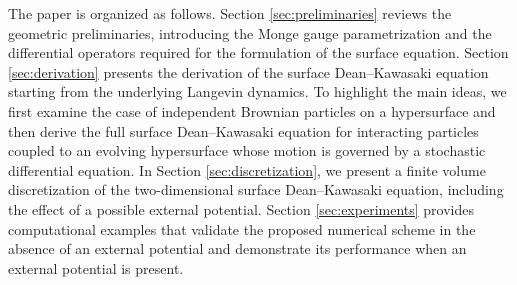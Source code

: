\documentclass[11pt, a4paper]{article}
\begin{document}
The paper is organized as follows. Section \ref{sec:preliminaries} reviews the geometric preliminaries, introducing the Monge gauge parametrization and the differential operators required for the formulation of the surface equation. Section \ref{sec:derivation} presents the derivation of the surface Dean–Kawasaki equation starting from the underlying Langevin dynamics. To highlight the main ideas, we first examine the case of independent Brownian particles on a hypersurface and then derive the full surface Dean–Kawasaki equation for interacting particles coupled to an evolving hypersurface whose motion is governed by a stochastic differential equation. In Section \ref{sec:discretization}, we present a finite volume discretization of the two-dimensional surface Dean--Kawasaki equation, including the effect of a possible external potential. Section \ref{sec:experiments} provides computational examples that validate the proposed numerical scheme in the absence of an external potential and demonstrate its performance when an external potential is present.





\end{document}
